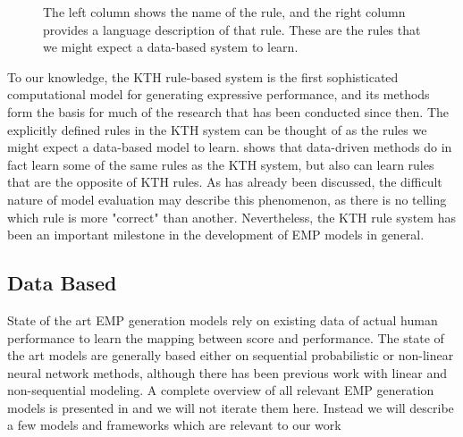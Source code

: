 \begin{figure}
    \centering
    \caption{The left column shows the name of the rule, and the right column provides a language description of that rule. These are the rules that we might expect a data-based system to learn.}
    \label{fig:kth-rules}
\end{figure}

To our knowledge, the KTH rule-based system is the first sophisticated computational model for generating expressive performance, and its methods form the basis for much of the research that has been conducted since then. The explicitly defined rules in the KTH system can be thought of as the rules we might expect a data-based model to learn. \citet{widmer2002machine} shows that data-driven methods do in fact learn some of the same rules as the KTH system, but also can learn rules that are the opposite of KTH rules. As has already been discussed, the difficult nature of model evaluation may describe this phenomenon, as there is no telling which rule is more "correct" than another. Nevertheless, the KTH rule system has been an important milestone in the development of EMP models in general. 

\subsection{Data Based}\label{sec:data-based}
State of the art EMP generation models rely on existing data of actual human performance to learn the mapping between score and performance. The state of the art models are generally based either on sequential probabilistic or non-linear neural network methods\cite{cancino2018computational}, although there has been previous work with linear and non-sequential modeling. A complete overview of all relevant EMP generation models is presented in \cite{cancino2018computational} and we will not iterate them here. Instead we will describe a few models and frameworks which are relevant to our work

